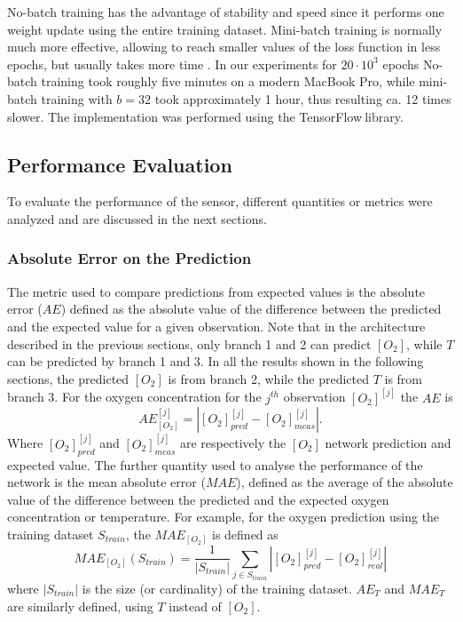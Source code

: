 \documentclass[9pt,twocolumn,twoside,pdftex]{optica}
\begin{document}
No-batch training has the advantage of stability and speed since it performs one weight update using the entire training dataset. Mini-batch training is normally much more effective, allowing to reach smaller values of the loss function in less epochs, but usually takes more time \cite{Michelucci2017}. In our experiments for $20 \cdot 10^3$ epochs No-batch training took roughly five minutes on a modern MacBook Pro, while mini-batch training with $b=32$ took approximately 1 hour, thus resulting ca. 12 times slower. 
The implementation was performed using the TensorFlow\texttrademark $\ $library. 


\subsection{Performance Evaluation}

To evaluate the performance of the sensor, different quantities or metrics were analyzed and are discussed in the next sections.


\subsubsection{Absolute Error on the Prediction}

The metric used to compare predictions from expected values is the absolute error ($AE$) defined as the absolute value of the difference between the predicted and the expected value for a given observation. Note that in the architecture described in the previous sections, only branch 1 and 2 can predict $[O_2]$, while $T$ can be predicted by branch 1 and 3. In all the results shown in the following sections, the predicted $[O_2]$ is from branch 2, while the predicted $T$ is from branch 3. For the oxygen concentration for the 
$j^{th}$ observation $[O_2]^{[j]}$  the $AE$ is 
\begin{equation}
\label{AE}
AE^{{[j]}}_{[O_2]} = |[O_2]^{{[j]}}_{pred}-[O_2]^{[j]}_{meas}|.
\end{equation}
Where $[O_2]^{{[j]}}_{pred}$ and $[O_2]^{{[j]}}_{meas}$ are respectively the $[O_2]$ network prediction and  expected value.
The further quantity used to analyse the performance of the network is the mean absolute error ($MAE$), defined as the average of the absolute value of the difference between the predicted and the expected oxygen concentration or temperature. For example, for the oxygen prediction using the training dataset $S_{train}$, the $MAE_{[O_2]}$ is defined as 
\begin{equation}
\label{MAE}
MAE_{[O_2]}(S_{train}) = \frac{1}{|S_{train}|} \sum_{j \in S_{train}}|[O_2]_{pred}^{[j]}-[O_2]_{real}^{[j]}|
\end{equation}
where $|S_{train}|$ is the size (or cardinality) of the training dataset. 
$AE_{T}$ and $MAE_T$ are similarly defined, using $T$ instead of $[O_2]$.
\end{document}
